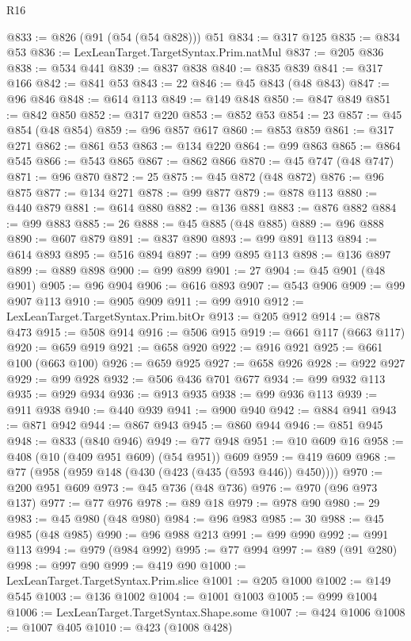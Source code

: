 \begin{lexlean}{R16}
\begin{coremodule}
@833 := @826 (@91 (@54 (@54 @828))) @51
@834 := @317 @125
@835 := @834 @53
@836 := LexLeanTarget.TargetSyntax.Prim.natMul
@837 := @205 @836
@838 := @534 @441
@839 := @837 @838
@840 := @835 @839
@841 := @317 @166
@842 := @841 @53
@843 := 22
@846 := @45 @843 (@48 @843)
@847 := @96 @846
@848 := @614 @113
@849 := @149 @848
@850 := @847 @849
@851 := @842 @850
@852 := @317 @220
@853 := @852 @53
@854 := 23
@857 := @45 @854 (@48 @854)
@859 := @96 @857 @617
@860 := @853 @859
@861 := @317 @271
@862 := @861 @53
@863 := @134 @220
@864 := @99 @863
@865 := @864 @545
@866 := @543 @865
@867 := @862 @866
@870 := @45 @747 (@48 @747)
@871 := @96 @870
@872 := 25
@875 := @45 @872 (@48 @872)
@876 := @96 @875
@877 := @134 @271
@878 := @99 @877
@879 := @878 @113
@880 := @440 @879
@881 := @614 @880
@882 := @136 @881
@883 := @876 @882
@884 := @99 @883
@885 := 26
@888 := @45 @885 (@48 @885)
@889 := @96 @888
@890 := @607 @879
@891 := @837 @890
@893 := @99 @891 @113
@894 := @614 @893
@895 := @516 @894
@897 := @99 @895 @113
@898 := @136 @897
@899 := @889 @898
@900 := @99 @899
@901 := 27
@904 := @45 @901 (@48 @901)
@905 := @96 @904
@906 := @616 @893
@907 := @543 @906
@909 := @99 @907 @113
@910 := @905 @909
@911 := @99 @910
@912 := LexLeanTarget.TargetSyntax.Prim.bitOr
@913 := @205 @912
@914 := @878 @473
@915 := @508 @914
@916 := @506 @915
@919 := @661 @117 (@663 @117)
@920 := @659 @919
@921 := @658 @920
@922 := @916 @921
@925 := @661 @100 (@663 @100)
@926 := @659 @925
@927 := @658 @926
@928 := @922 @927
@929 := @99 @928
@932 := @506 @436 @701 @677
@934 := @99 @932 @113
@935 := @929 @934
@936 := @913 @935
@938 := @99 @936 @113
@939 := @911 @938
@940 := @440 @939
@941 := @900 @940
@942 := @884 @941
@943 := @871 @942
@944 := @867 @943
@945 := @860 @944
@946 := @851 @945
@948 := @833 (@840 @946)
@949 := @77 @948
@951 := @10 @609 @16
@958 := @408 (@10 (@409 @951 @609) (@54 @951)) @609
@959 := @419 @609
@968 := @77 (@958 (@959 @148 (@430 (@423 (@435 (@593 @446)) @450))))
@970 := @200 @951 @609
@973 := @45 @736 (@48 @736)
@976 := @970 (@96 @973 @137)
@977 := @77 @976
@978 := @89 @18
@979 := @978 @90
@980 := 29
@983 := @45 @980 (@48 @980)
@984 := @96 @983
@985 := 30
@988 := @45 @985 (@48 @985)
@990 := @96 @988 @213
@991 := @99 @990
@992 := @991 @113
@994 := @979 (@984 @992)
@995 := @77 @994
@997 := @89 (@91 @280)
@998 := @997 @90
@999 := @419 @90
@1000 := LexLeanTarget.TargetSyntax.Prim.slice
@1001 := @205 @1000
@1002 := @149 @545
@1003 := @136 @1002
@1004 := @1001 @1003
@1005 := @999 @1004
@1006 := LexLeanTarget.TargetSyntax.Shape.some
@1007 := @424 @1006
@1008 := @1007 @405
@1010 := @423 (@1008 @428)

\end{coremodule}
\end{lexlean}
